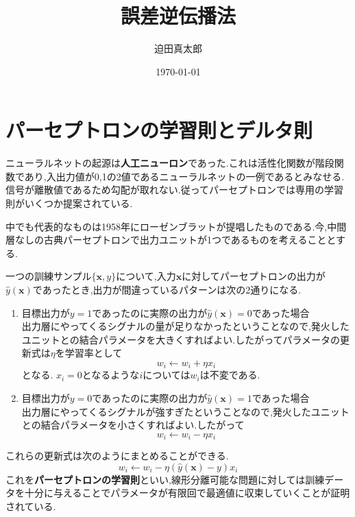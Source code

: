 \documentclass[twocolumn]{jarticle}
\title{誤差逆伝播法}
\author{迫田真太郎}
\date{\today}
\begin{document}
\maketitle

\section{パーセプトロンの学習則とデルタ則}
ニューラルネットの起源は{\bf 人工ニューロン}であった.これは活性化関数が階段関数であり,入出力値が0,1の2値であるニューラルネットの一例であるとみなせる.信号が離散値であるため勾配が取れない.従ってパーセプトロンでは専用の学習則がいくつか提案されている.

中でも代表的なものは1958年にローゼンブラットが提唱したものである.今,中間層なしの古典パーセプトロンで出力ユニットが1つであるものを考えることとする.

一つの訓練サンプル$\{\bm{x}, y\}$について,入力$\bm{x}$に対してパーセプトロンの出力が$\hat{y}(\bm{x})$であったとき,出力が間違っているパターンは次の2通りになる.

\begin{enumerate}
  \item 目標出力が$y = 1$であったのに実際の出力が$\hat{y}(\bm{x}) = 0$であった場合\\
出力層にやってくるシグナルの量が足りなかったということなので,発火したユニットとの結合パラメータを大きくすればよい.したがってパラメータの更新式は$\eta$を学習率として
\begin{equation}
   w_i \longleftarrow w_i + \eta x_i
\end{equation}
となる. $x_i = 0$となるような$i$については$w_i$は不変である.

  \item 目標出力が$y = 0$であったのに実際の出力が$\hat{y}(\bm{x}) = 1$であった場合\\
出力層にやってくるシグナルが強すぎたということなので,発火したユニットとの結合パラメータを小さくすればよい.したがって
\begin{equation}
   w_i \longleftarrow w_i - \eta x_i
\end{equation}
\end{enumerate}
これらの更新式は次のようにまとめることができる.
\begin{equation}
   w_i \longleftarrow w_i - \eta (\hat{y}(\bm{x}) - y) x_i
\end{equation}
これを{\bf パーセプトロンの学習則}といい,線形分離可能な問題に対しては訓練データを十分に与えることでパラメータが有限回で最適値に収束していくことが証明されている.
\end{document}
